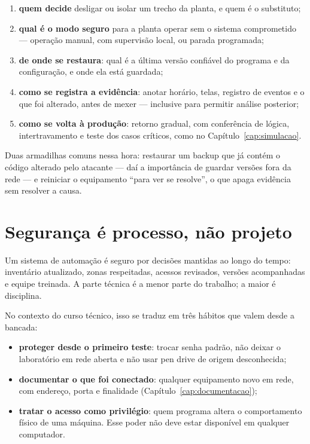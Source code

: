 \begin{enumerate}
  \item \textbf{quem decide} desligar ou isolar um trecho da planta, e quem é o substituto;
  \item \textbf{qual é o modo seguro} para a planta operar sem o sistema comprometido --- operação
        manual, com supervisão local, ou parada programada;
  \item \textbf{de onde se restaura}: qual é a última versão confiável do programa e da configuração,
        e onde ela está guardada;
  \item \textbf{como se registra a evidência}: anotar horário, telas, registro de eventos e o que foi
        alterado, antes de mexer --- inclusive para permitir análise posterior;
  \item \textbf{como se volta à produção}: retorno gradual, com conferência de lógica, intertravamento
        e teste dos casos críticos, como no Capítulo~\ref{cap:simulacao}.
\end{enumerate}

Duas armadilhas comuns nessa hora: restaurar um backup que já contém o código alterado pelo atacante
--- daí a importância de guardar versões fora da rede --- e reiniciar o equipamento ``para ver se
resolve'', o que apaga evidência sem resolver a causa.

\section{Segurança é processo, não projeto}

Um sistema de automação é seguro por decisões mantidas ao longo do tempo: inventário atualizado,
zonas respeitadas, acessos revisados, versões acompanhadas e equipe treinada. A parte técnica é a
menor parte do trabalho; a maior é disciplina.

No contexto do curso técnico, isso se traduz em três hábitos que valem desde a bancada:

\begin{itemize}
  \item \textbf{proteger desde o primeiro teste}: trocar senha padrão, não deixar o laboratório em
        rede aberta e não usar pen drive de origem desconhecida;
  \item \textbf{documentar o que foi conectado}: qualquer equipamento novo em rede, com endereço,
        porta e finalidade (Capítulo~\ref{cap:documentacao});
  \item \textbf{tratar o acesso como privilégio}: quem programa altera o comportamento físico de uma
        máquina. Esse poder não deve estar disponível em qualquer computador.
\end{itemize}

